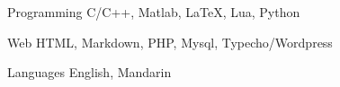 

\begin{cvskills}

  \cvskill
    {Programming} %
    {C/C++, Matlab, LaTeX, Lua, Python} %

  \cvskill
    {Web} %
    {HTML, Markdown, PHP, Mysql, Typecho/Wordpress} %

  \cvskill
    {Languages} %
    {English, Mandarin} %

\end{cvskills}
